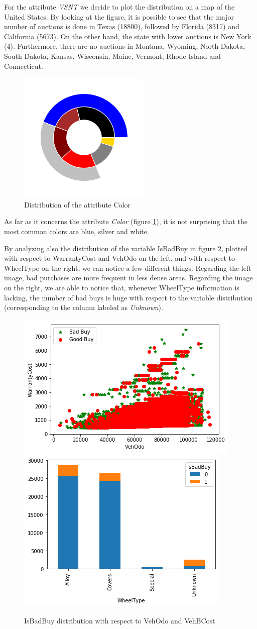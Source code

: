 \documentclass{article}
\begin{document}
	
	For the attribute \emph{VSNT} we decide to plot the distribution on a map of the United States. By looking at the figure, it is possible to see that the major number of auctions is done in Texas (18800), followed by Florida (8317) and California (5673). On the other hand, the state with lower auctions is New York (4). Furthermore, there are no auctions in Montana, Wyoming, North Dakota, South Dakota, Kansas, Wisconsin, Maine, Vermont, Rhode Island and Connecticut.
	\begin{figure}[H]
		\centering
		\includegraphics[width=.2\textwidth]{color.png}
		\caption{Distribution of the attribute Color}
		\label{fig:color}
	\end{figure}
	
	
	As far as it concerns the attribute \emph{Color} (figure \ref{fig:color}), it is not surprising that the most common colors are blue, silver and white.
	
	
	By analyzing also the distribution of the variable IsBadBuy in figure \ref{fig:badbuys}, plotted with respect to WarrantyCost and VehOdo on the left, and with respect to WheelType on the right, we can notice a few different things. Regarding the left image, bad purchases are more frequent in less dense areas. Regarding the image on the right, we are able to notice that, whenever WheelType information is lacking, the number of bad buys is huge with respect to the variable distribution (corresponding to the column labeled as \emph{Unknown}).
	
	\begin{figure}[H]
		\centering
		\includegraphics[width=.4\textwidth, keepaspectratio]{badbuys} \hspace{1cm}
		\includegraphics[width=.3\textwidth, keepaspectratio]{wheeltype}
		\caption{IsBadBuy distribution with respect to VehOdo and VehBCost}
		\label{fig:badbuys}
	\end{figure}
	
\end{document}
